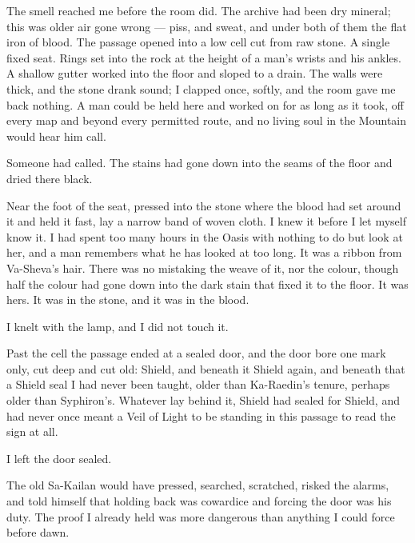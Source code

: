 The smell reached me before the room did. The archive had been dry mineral; this was older air gone wrong --- piss, and sweat, and under both of them the flat iron of blood. The passage opened into a low cell cut from raw stone. A single fixed seat. Rings set into the rock at the height of a man's wrists and his ankles. A shallow gutter worked into the floor and sloped to a drain. The walls were thick, and the stone drank sound; I clapped once, softly, and the room gave me back nothing. A man could be held here and worked on for as long as it took, off every map and beyond every permitted route, and no living soul in the Mountain would hear him call.\par

Someone had called. The stains had gone down into the seams of the floor and dried there black.\par

Near the foot of the seat, pressed into the stone where the blood had set around it and held it fast, lay a narrow band of woven cloth. I knew it before I let myself know it. I had spent too many hours in the Oasis with nothing to do but look at her, and a man remembers what he has looked at too long. It was a ribbon from Va-Sheva's hair. There was no mistaking the weave of it, nor the colour, though half the colour had gone down into the dark stain that fixed it to the floor. It was hers. It was in the stone, and it was in the blood.\par

I knelt with the lamp, and I did not touch it.\par

Past the cell the passage ended at a sealed door, and the door bore one mark only, cut deep and cut old: Shield, and beneath it Shield again, and beneath that a Shield seal I had never been taught, older than Ka-Raedin's tenure, perhaps older than Syphiron's. Whatever lay behind it, Shield had sealed for Shield, and had never once meant a Veil of Light to be standing in this passage to read the sign at all.\par

I left the door sealed.\par

The old Sa-Kailan would have pressed, searched, scratched, risked the alarms, and told himself that holding back was cowardice and forcing the door was his duty. The proof I already held was more dangerous than anything I could force before dawn.\par

